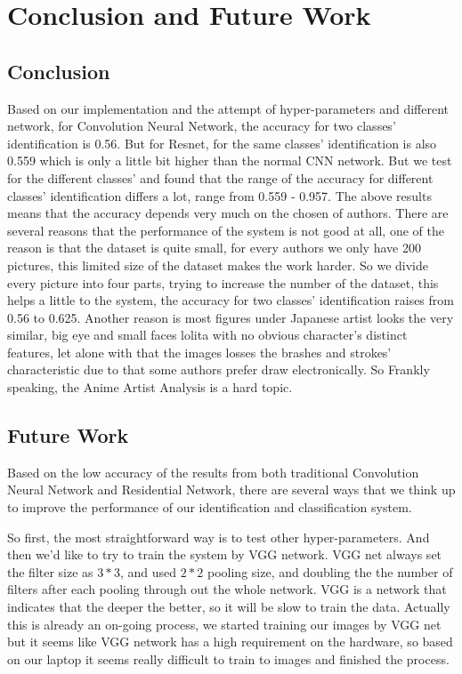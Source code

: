 \documentclass{article}
\begin{document}
\section{Conclusion and Future Work}

\subsection{Conclusion}
Based on our implementation and the attempt of hyper-parameters and different network, for Convolution Neural Network, the accuracy for two classes' identification is 0.56. But for Resnet, for the same classes' identification is also 0.559 which is only a little bit higher than the normal CNN network. But we test for the different classes' and found that the range of the accuracy for different classes' identification differs a lot, range from 0.559 - 0.957. The above results means that the accuracy depends very much on the chosen of authors. There are several reasons that the performance of the system is not good at all, one of the reason is that the dataset is quite small, for every authors we only have 200 pictures, this limited size of the dataset makes the work harder. So we divide every picture into four parts, trying to increase the number of the dataset, this helps a little to the system, the accuracy for two classes' identification raises from 0.56 to 0.625. Another reason is most figures under Japanese artist looks the very similar, big eye and small faces lolita with no obvious character's distinct features, let alone with that the images losses the brashes and strokes' characteristic due to that some authors prefer draw electronically. So Frankly speaking, the Anime Artist Analysis is a hard topic. 
    
\subsection{Future Work}
Based on the low accuracy of the results from both traditional Convolution Neural Network and Residential Network, there are several ways that we think up to improve the performance of our identification and classification system. 

So first, the most straightforward way is to test other hyper-parameters. And then we'd like to try to train the system by VGG network. VGG net always set the filter size as $3*3$, and used $2*2$ pooling size, and doubling the the number of filters after each pooling through out the whole network. VGG is a network that indicates that the deeper the better, so it will be slow to train the data. Actually this is already an on-going process, we started training our images by VGG net but it seems like VGG network has a high requirement on the hardware, so based on our laptop it seems really difficult to train to images and finished the process. 
\end{document}
